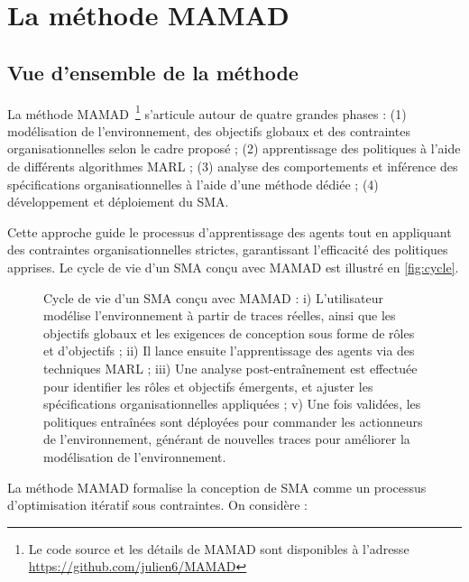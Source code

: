 \documentclass[pdflatex,sn-mathphys-num]{sn-jnl}%
\theoremstyle{thmstyleone}%
\theoremstyle{thmstyletwo}%
\theoremstyle{thmstylethree}%
\begin{document}
\section{La méthode MAMAD}\label{sec:mamad}

\subsection{Vue d'ensemble de la méthode}

La méthode MAMAD~\footnote{Le code source et les détails de MAMAD sont disponibles à l'adresse \url{https://github.com/julien6/MAMAD}} s'articule autour de quatre grandes phases :  
(1) modélisation de l'environnement, des objectifs globaux et des contraintes organisationnelles selon le cadre proposé ;  
(2) apprentissage des politiques à l'aide de différents algorithmes MARL ;  
(3) analyse des comportements et inférence des spécifications organisationnelles à l'aide d'une méthode dédiée ;  
(4) développement et déploiement du SMA.  

Cette approche guide le processus d'apprentissage des agents tout en appliquant des contraintes organisationnelles strictes, garantissant l'efficacité des politiques apprises. Le cycle de vie d'un SMA conçu avec MAMAD est illustré en \autoref{fig:cycle}.

\begin{figure}[h!]
    \centering
    
    \caption{Cycle de vie d'un SMA conçu avec MAMAD :
        i) L'utilisateur modélise l'environnement à partir de traces réelles, ainsi que les objectifs globaux et les exigences de conception sous forme de rôles et d'objectifs ;  
        ii) Il lance ensuite l'apprentissage des agents via des techniques MARL ;  
        iii) Une analyse post-entraînement est effectuée pour identifier les rôles et objectifs émergents, et ajuster les spécifications organisationnelles appliquées ;  
        v) Une fois validées, les politiques entraînées sont déployées pour commander les actionneurs de l'environnement, générant de nouvelles traces pour améliorer la modélisation de l'environnement.
    }
    \label{fig:cycle}
\end{figure}

La méthode MAMAD formalise la conception de SMA comme un processus d'optimisation itératif sous contraintes. On considère :
\end{document}
